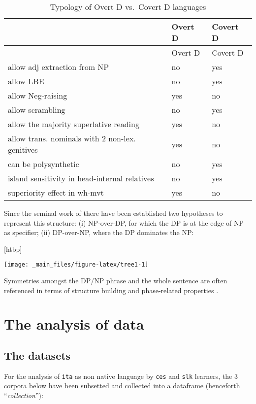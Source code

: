 \documentclass[a4paper,twoside,12pt,chapterprefix=false,listof=flat]{scrartcl}
\makeatletter
\def\fps@figure{htbp}
\renewenvironment{figure}[1][\fps@figure]{
  \edef\@tempa{\noexpand\@float{figure}[#1]} 
  \@tempa
  \sffamily
}{
  \end@float
}
\theoremstyle{plain} %
\theoremstyle{definition}
\theoremstyle{remark}
\makeatother
\begin{document}
\begin{longtable}[]{@{}lll@{}}
\caption{Typology of Overt D vs.~Covert D languages}\tabularnewline
\toprule
& Overt D & Covert D\tabularnewline
\midrule
\endfirsthead
\toprule
& Overt D & Covert D\tabularnewline
\midrule
\endhead
allow adj extraction from NP & no & yes\tabularnewline
allow LBE & no & yes\tabularnewline
allow Neg-raising & yes & no\tabularnewline
allow scrambling & no & yes\tabularnewline
allow the majority superlative reading & yes & no\tabularnewline
allow trans. nominals with 2 non-lex. genitives & yes &
no\tabularnewline
can be polysynthetic & no & yes\tabularnewline
island sensitivity in head-internal relatives & no & yes\tabularnewline
superiority effect in wh-mvt & yes & no\tabularnewline
\bottomrule
\end{longtable}

Since the seminal work of \citep{abney1987} there have been established
two hypotheses to represent this structure: (i) NP-over-DP, for which
the DP is at the edge of NP as specifier; (ii) DP-over-NP, where the DP
dominates the NP:

\begin{figure}

{\centering \texttt{[image: \_main\_files/figure-latex/tree1-1]} 

}

\caption{Phrase structure in NP-over-DP vs. DP-over-NP Hypotheses}\label{fig:tree1}
\end{figure}

Symmetries amongst the DP/NP phrase and the whole sentence are often
referenced in terms of structure building and phase-related properties
\citep{chomsky2013, chomsky2015}.

\hypertarget{sec:caseStudy}{%
\section{The analysis of data}\label{sec:caseStudy}}

\hypertarget{the-datasets}{%
\subsection{The datasets}\label{the-datasets}}

For the analysis of \texttt{ita} as non native language by \texttt{ces}
and \texttt{slk} learners, the 3 corpora below have been subsetted and
collected into a dataframe (henceforth \enquote{\emph{collection}}):
\end{document}

